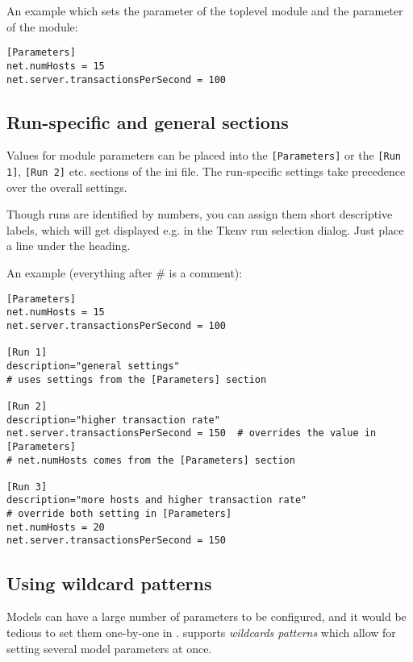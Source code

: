 An example  which sets the  parameter of
the toplevel module and the  parameter of the
 module:

\begin{verbatim}
[Parameters]
net.numHosts = 15
net.server.transactionsPerSecond = 100
\end{verbatim}


\subsection{Run-specific and general sections}

Values for module parameters can be placed into the \texttt{[Parameters]}
or the \texttt{[Run 1]}, \texttt{[Run 2]} etc. sections of the ini file.
The run-specific settings take precedence over the overall settings.

Though runs are identified by numbers, you can assign them short
descriptive labels, which will get displayed e.g. in the Tkenv
run selection dialog. Just place a 
line under the \ttt{[Run x]} heading. {\new}

An example  (everything after \# is a comment):

\begin{verbatim}
[Parameters]
net.numHosts = 15
net.server.transactionsPerSecond = 100

[Run 1]
description="general settings"
# uses settings from the [Parameters] section

[Run 2]
description="higher transaction rate"
net.server.transactionsPerSecond = 150  # overrides the value in [Parameters]
# net.numHosts comes from the [Parameters] section

[Run 3]
description="more hosts and higher transaction rate"
# override both setting in [Parameters]
net.numHosts = 20
net.server.transactionsPerSecond = 150
\end{verbatim}




\subsection{Using wildcard patterns}
\label{sec:ch-run-sim:wildcards}

Models can have a large number of parameters to be configured, and it would
be tedious to set them one-by-one in . {\opp} supports
\textit{wildcards patterns} which allow for setting several model parameters
at once.

